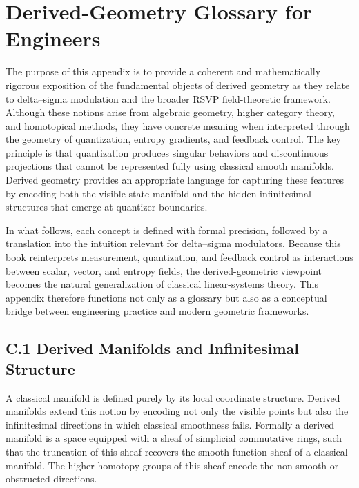 
\chapter{Derived-Geometry Glossary for Engineers}

The purpose of this appendix is to provide a coherent and mathematically rigorous exposition of the fundamental objects of derived geometry as they relate to delta–sigma modulation and the broader RSVP field-theoretic framework. Although these notions arise from algebraic geometry, higher category theory, and homotopical methods, they have concrete meaning when interpreted through the geometry of quantization, entropy gradients, and feedback control. The key principle is that quantization produces singular behaviors and discontinuous projections that cannot be represented fully using classical smooth manifolds. Derived geometry provides an appropriate language for capturing these features by encoding both the visible state manifold and the hidden infinitesimal structures that emerge at quantizer boundaries.

In what follows, each concept is defined with formal precision, followed by a translation into the intuition relevant for delta–sigma modulators. Because this book reinterprets measurement, quantization, and feedback control as interactions between scalar, vector, and entropy fields, the derived-geometric viewpoint becomes the natural generalization of classical linear-systems theory. This appendix therefore functions not only as a glossary but also as a conceptual bridge between engineering practice and modern geometric frameworks.

\section{C.1 Derived Manifolds and Infinitesimal Structure}

A classical manifold is defined purely by its local coordinate structure. Derived manifolds extend this notion by encoding not only the visible points but also the infinitesimal directions in which classical smoothness fails. Formally a derived manifold is a space equipped with a sheaf of simplicial commutative rings, such that the truncation of this sheaf recovers the smooth function sheaf of a classical manifold. The higher homotopy groups of this sheaf encode the non-smooth or obstructed directions.

